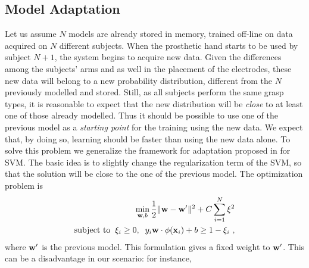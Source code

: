 \subsection{Model Adaptation}
\label{sec:adapt}

Let us assume $N$ models are already stored in memory, trained
off-line on data acquired on $N$ different subjects. When the
prosthetic hand starts to be used by subject $N+1$, the system begins
to acquire new data. Given the differences among the subjects' arms
and as well in the placement of the electrodes, these new data will
belong to a new probability distribution, different from the $N$
previously modelled and stored. Still, as all subjects perform the
same grasp types, it is reasonable to expect that the new distribution
will be \emph{close} to at least one of those already modelled.
Thus it should be possible to use one of the previous model as a
\emph{starting point} for the training using the new data.
We expect that, by doing so,  learning should be faster
than using the new data alone. 
To solve this problem we generalize the framework for adaptation proposed in
\cite{YangYH07} for SVM. 
The basic idea is to slightly change the regularization term of the
SVM, so that the solution will be close to the one of the previous
model.  The optimization problem is \cite{YangYH07} %
\begin{align}
  \min_{\mathbf{w},b} \frac{1}{2} \|\mathbf{w}- \mathbf{w}'\|^2 + C \sum_{i=1}^N \xi^2 \nonumber \\
  \mbox{subject to} \;\;
  \xi_i \geq 0,\;\; y_i \mathbf{w} \cdot \phi(\mathbf{x}_i) + b \geq 1-\xi_i~,
  \label{eq:opt_prob_orig}
\end{align}
\noindent where $\mathbf{w}'$ is the previous model.
This formulation gives a fixed weight to $\mathbf{w}'$. This can be a
disadvantage in our scenario: for instance,
